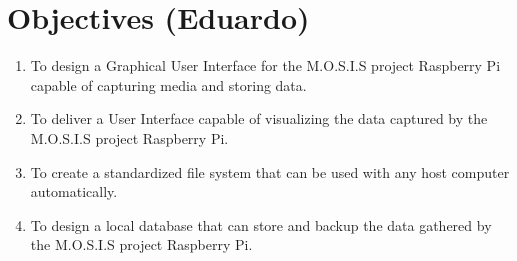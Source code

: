 \section{Objectives (Eduardo)}
\begin{enumerate}
    \item To design a Graphical User Interface for the M.O.S.I.S project Raspberry Pi capable of capturing media and storing data. 
    \item To deliver a User Interface capable of visualizing the data captured by the M.O.S.I.S project Raspberry Pi.
    \item To create a standardized file system that can be used with any host computer automatically.
    \item To design a local database that can store and backup the data gathered by the M.O.S.I.S project Raspberry Pi.
\end{enumerate}